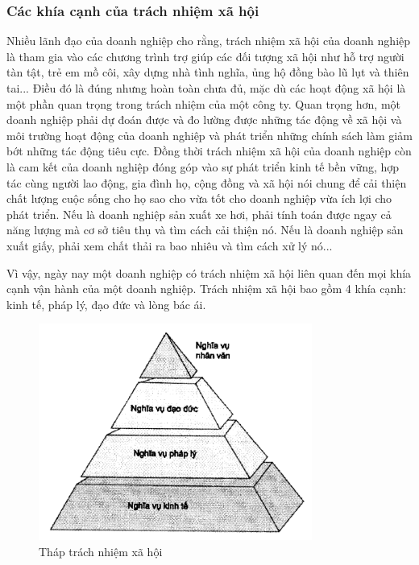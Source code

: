 \documentclass{article}
\begin{document}
    \subsubsection{Các khía cạnh của trách nhiệm xã hội}
        \vspace{0.2cm}
        Nhiều lãnh đạo của doanh nghiệp cho rằng, trách nhiệm xã hội của doanh nghiệp là tham gia vào các chương trình trợ giúp các đối tượng xã hội như hỗ trợ người tàn tật, trẻ em mồ côi, xây dựng nhà tình nghĩa, ủng hộ đồng bào lũ lụt và thiên tai... Điều đó là đúng nhưng hoàn toàn chưa đủ, mặc dù các hoạt động xã hội là một phần quan trọng trong trách nhiệm của một công ty. Quan trọng hơn, một doanh nghiệp phải dự đoán được và đo lường được những tác động về xã hội và môi trường hoạt động của doanh nghiệp và phát triển những chính sách làm giảm bớt những tác động tiêu cực. Đồng thời trách nhiệm xã hội của doanh nghiệp còn là cam kết của doanh nghiệp đóng góp vào sự phát triển kinh tế bền vững, hợp tác cùng người lao động, gia đình họ, cộng đồng và xã hội nói chung để cải thiện chất lượng cuộc sống cho họ sao cho vừa tốt cho doanh nghiệp vừa ích lợi cho phát triển. Nếu là doanh nghiệp sản xuất xe hơi, phải tính toán được ngay cả năng lượng mà cơ sở tiêu thụ và tìm cách cải thiện nó. Nếu là doanh nghiệp sản xuất giấy, phải xem chất thải ra bao nhiêu và tìm cách xử lý nó...

        \vspace{0.2cm}
        Vì vậy, ngày nay một doanh nghiệp có trách nhiệm xã hội liên quan đến mọi khía cạnh vận hành của một doanh nghiệp. Trách nhiệm xã hội bao gồm 4 khía cạnh: kinh tế, pháp lý, đạo đức và lòng bác ái.

        \begin{figure}[H]
            \centering
            \includegraphics[width=0.8\textwidth]{assert/img2.png}
            \caption{Tháp trách nhiệm xã hội}
            \label{fig:img2}
        \end{figure}
\end{document}
